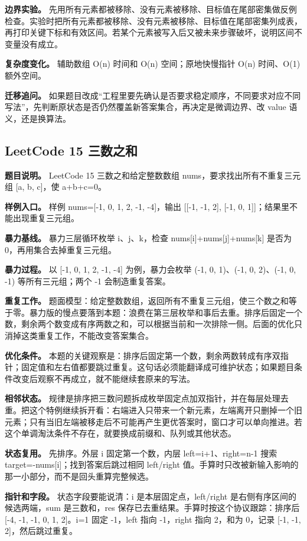 \textbf{边界实验。} 先用所有元素都被移除、没有元素被移除、目标值在尾部密集做反例检查。实验时把所有元素都被移除、没有元素被移除、目标值在尾部密集列成表，再打印关键下标和有效区间。若某个元素被写入后又被未来步骤破坏，说明区间不变量没有成立。

\textbf{复杂度变化。} 辅助数组 O(n) 时间和 O(n) 空间；原地快慢指针 O(n) 时间、O(1) 额外空间。

\textbf{迁移追问。} 如果题目改成“工程里要先确认是否要求稳定顺序，不同要求对应不同写法”，先判断原状态是否仍然覆盖新答案集合，再决定是微调边界、改 value 语义，还是换算法。

\subsection{LeetCode 15 三数之和}

\textbf{题目说明。} LeetCode 15 三数之和给定整数数组 nums，要求找出所有不重复三元组 [a, b, c]，使 a+b+c=0。

\textbf{样例入口。} 样例 nums=[-1, 0, 1, 2, -1, -4]，输出 [[-1, -1, 2], [-1, 0, 1]]；结果里不能出现重复三元组。

\textbf{暴力基线。} 暴力三层循环枚举 i、j、k，检查 nums[i]+nums[j]+nums[k] 是否为 0，再用集合去掉重复三元组。

\textbf{暴力过程。} 以 [-1, 0, 1, 2, -1, -4] 为例，暴力会枚举 (-1, 0, 1)、(-1, 0, 2)、(-1, 0, -1) 等所有三元组；两个 -1 会制造重复答案。

\textbf{重复工作。} 题面模型：给定整数数组，返回所有不重复三元组，使三个数之和等于零。暴力版的慢点要落到本题：浪费在第三层枚举和事后去重。排序后固定一个数，剩余两个数变成有序两数之和，可以根据当前和一次排除一侧。后面的优化只消掉这类重复工作，不能改变答案集合。

\textbf{优化条件。} 本题的关键观察是：排序后固定第一个数，剩余两数转成有序双指针；固定值和左右值都要跳过重复。这句话必须能翻译成可维护状态；如果题目条件改变后观察不再成立，就不能继续套原来的写法。

\textbf{相邻状态。} 规律是排序把三数问题拆成枚举固定点加双指针，并在每层处理去重。把这个特例继续拆开看：右端进入只带来一个新元素，左端离开只删掉一个旧元素；只有当旧左端被移走后不可能再产生更优答案时，窗口才可以单向推进。若这个单调淘汰条件不存在，就要换成前缀和、队列或其他状态。

\textbf{状态复用。} 先排序。外层 i 固定第一个数，内层 left=i+1、right=n-1 搜索 target=-nums[i]；找到答案后跳过相同 left/right 值。手算时只改被新输入影响的那一小部分，而不是回头重算完整候选。

\textbf{指针和字段。} 状态字段要能说清：i 是本层固定点，left/right 是右侧有序区间的候选两端，sum 是三数和，res 保存已去重结果。手算时按这个协议跟踪：排序后 [-4, -1, -1, 0, 1, 2]。i=1 固定 -1，left 指向 -1，right 指向 2，和为 0，记录 [-1, -1, 2]，然后跳过重复。

